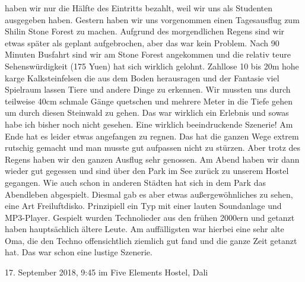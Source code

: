 \documentclass[11pt]{book}
\begin{document}
haben wir nur die Hälfte des Eintritts bezahlt, weil wir uns als Studenten ausgegeben haben. 
Gestern haben wir uns vorgenommen einen Tagesausflug zum Shilin Stone Forest zu machen. Aufgrund des morgendlichen 
Regens sind wir etwas später als geplant aufgebrochen, aber das war kein Problem. Nach 90 Minuten Busfahrt sind 
wir am Stone Forest angekommen und die relativ teure Sehenswürdigkeit (175 Yuen) hat sich wirklich gelohnt. 
Zahllose 10 bis 20m hohe karge Kalksteinfelsen die aus dem Boden herausragen und der Fantasie viel Spielraum 
lassen Tiere und andere Dinge zu erkennen. Wir mussten uns durch teilweise 40cm schmale Gänge quetschen und 
mehrere Meter in die Tiefe gehen um durch diesen Steinwald zu gehen. Das war wirklich ein Erlebnis und sowas habe 
ich bisher noch nicht gesehen. Eine wirklich beeindruckende Szenerie! Am Ende hat es leider etwas angefangen zu 
regnen. Das hat die ganzen Wege extrem rutschig gemacht und man musste gut aufpassen nicht zu stürzen. Aber 
trotz des Regens haben wir den ganzen Ausflug sehr genossen. 
Am Abend haben wir dann wieder gut gegessen und sind über den Park im See zurück zu unserem Hostel gegangen. 
Wie auch schon in anderen Städten hat sich in dem Park das Abendleben abgespielt. Diesmal gab es aber etwas 
außergewöhnliches zu sehen, eine Art Freiluftdisko. Prinzipiell ein Typ mit einer lauten Soundanlage und MP3-Player.
Gespielt wurden Technolieder aus den frühen 2000ern und getanzt haben hauptsächlich ältere Leute. Am auffälligsten 
war hierbei eine sehr alte Oma, die den Techno offensichtlich ziemlich gut fand und die ganze Zeit getanzt hat.
Das war schon eine lustige Szenerie.

17. September 2018, 9:45 im Five Elements Hostel, Dali
\end{document}
